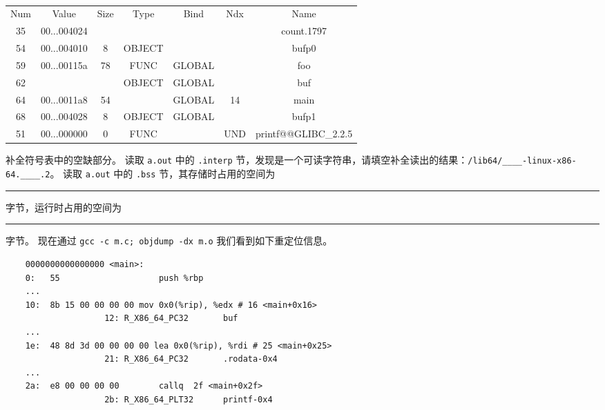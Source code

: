 \begin{problems}
\begin{table}[H]
\begin{tabular}{|cccccc|}
            \end{tabular}
        \end{table}
        \begin{table}[H]
            \tt
            \centering
            \begin{tabular}{ccccccc}
                \hline
                \multicolumn{1}{|c}{Num} & Value & Size & Type & Bind & Ndx & \multicolumn{1}{c|}{Name} \\
                \multicolumn{1}{|c}{35} & 00...004024 &  & &  &  & \multicolumn{1}{c|}{count.1797} \\
                \multicolumn{1}{|c}{54} & 00...004010 & 8 & OBJECT &  &  & \multicolumn{1}{c|}{bufp0} \\
                \multicolumn{1}{|c}{59} & 00...00115a & 78 & FUNC & GLOBAL &  & \multicolumn{1}{c|}{foo} \\
                \multicolumn{1}{|c}{62} &  &  & OBJECT & GLOBAL &  & \multicolumn{1}{c|}{buf} \\
                \multicolumn{1}{|c}{64} & 00...0011a8 & 54 &  & GLOBAL & 14 & \multicolumn{1}{c|}{main} \\
                \multicolumn{1}{|c}{68} & 00...004028 & 8 & OBJECT & GLOBAL &  & \multicolumn{1}{c|}{bufp1} \\
                \multicolumn{1}{|c}{51} & 00...000000 & 0 & FUNC &  & UND & \multicolumn{1}{c|}{printf@@GLIBC\_2.2.5} \\ \hline
            \end{tabular}
        \end{table}
            \subqn 补全符号表中的空缺部分。
            \subqn 读取 \verb|a.out| 中的 \verb|.interp| 节，发现是一个可读字符串，请填空补全读出的结果：\verb|/lib64/____-linux-x86-64.____.2|。
            \subqn 读取 \verb|a.out| 中的 \verb|.bss| 节，其存储时占用的空间为 \rule{2.5cm}{0.25mm} 字节，运行时占用的空间为 \rule{2.5cm}{0.25mm} 字节。
        \qn 现在通过 \verb|gcc -c m.c; objdump -dx m.o| 我们看到如下重定位信息。
        \begin{verbatim}
    0000000000000000 <main>:
    0:   55                    push %rbp
    ...
    10:  8b 15 00 00 00 00 mov 0x0(%rip), %edx # 16 <main+0x16>
                    12: R_X86_64_PC32       buf
    ...
    1e:  48 8d 3d 00 00 00 00 lea 0x0(%rip), %rdi # 25 <main+0x25>
                    21: R_X86_64_PC32       .rodata-0x4
    ...
    2a:  e8 00 00 00 00        callq  2f <main+0x2f>
                    2b: R_X86_64_PLT32      printf-0x4

\end{verbatim}
\end{problems}
